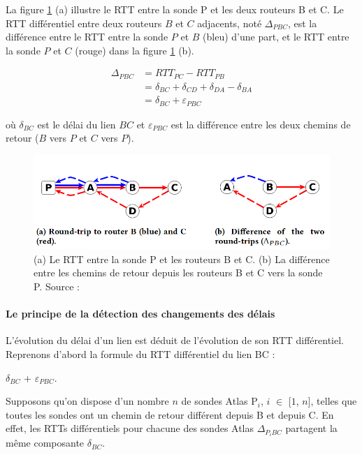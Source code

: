 La figure 	\ref{fig:rtt-differ} (a)  illustre le RTT entre la sonde P et les deux routeurs B et C. Le RTT différentiel  entre deux routeurs $B$ et $C$ adjacents, noté $\Delta_{PBC}$, est la différence entre le RTT entre la sonde $P$ et $B$ (bleu) d'une part, et le RTT entre la sonde $P$ et $C$ (rouge) dans la figure 	\ref{fig:rtt-differ} (b). 

\begin{align*}
\Delta_{PBC} &= RTT_{PC} - RTT_{PB} \\
&= \delta_{BC} + \delta_{CD} + \delta_{DA}  - \delta_{BA} \\
&= \delta_{BC} + \varepsilon_{PBC}
\end{align*}

où $\delta_{BC}$ est le délai du lien $BC$ et $\varepsilon_{PBC}$ est la différence entre les deux chemins de retour ($B$ vers $P$ et $C$ vers $P$). 
\begin{figure}[H]
	\centering
		\captionsetup{justification= centering}
	\includegraphics[width=0.7\linewidth]{illustrations/rtt-differ}
	\caption{(a) Le RTT entre la sonde P et les routeurs B et C. (b) La différence entre les  chemins de retour depuis les routeurs B et C vers la sonde P. Source : \cite{DBLP:journals/corr/FontugneAPB16}}
	\label{fig:rtt-differ}
\end{figure}

\paragraph{Le principe de la détection des changements des délais}

L'évolution du délai d'un lien est déduit de l'évolution de son RTT différentiel. Reprenons d'abord la formule du RTT différentiel du lien BC : 

 $\delta_{BC}$ + $\varepsilon_{PBC}$. 
 
 Supposons qu'on dispose d'un nombre $n$ de sondes Atlas P$_i$, $i$ $\in$ [$1$, $n$], telles que toutes les sondes ont un chemin de retour différent depuis B et depuis C.  En effet, les RTTs différentiels pour chacune des sondes Atlas $\Delta_{P{_i}BC}$ partagent la même composante $\delta_{BC}$.

